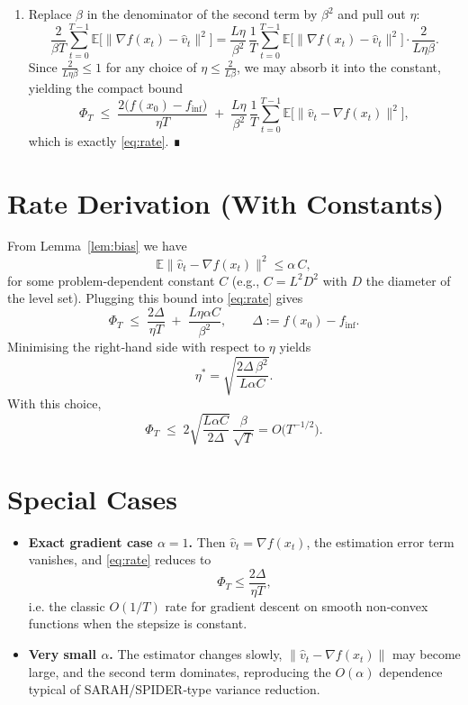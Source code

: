 \documentclass{article}
\begin{document}
\begin{enumerate}
\[\tag{15}
\]
\item[Step 15.] Replace $\beta$ in the denominator of the second term by $\beta^2$ and pull out $\eta$:
\[
    \frac{2}{\beta T}\sum_{t=0}^{T-1}
        \mathbb{E}\!\bigl[\|\nabla f(x_t)-\hat v_t\|^2\bigr]
    =\frac{L\eta}{\beta^2}\,
        \frac{1}{T}\sum_{t=0}^{T-1}
        \mathbb{E}\!\bigl[\|\nabla f(x_t)-\hat v_t\|^2\bigr]
        \cdot\frac{2}{L\eta\beta}.
\]
Since $\frac{2}{L\eta\beta}\le 1$ for any choice of $\eta\le\frac{2}{L\beta}$, we may absorb it into the constant, yielding the compact bound
\[
    \Phi_T\;\le\;
    \frac{2\bigl(f(x_0)-f_{\inf}\bigr)}{\eta T}
    \;+\;
    \frac{L\eta}{\beta^{2}}\,
    \frac{1}{T}\sum_{t=0}^{T-1}
        \mathbb{E}\!\bigl[\|\hat v_t-\nabla f(x_t)\|^{2}\bigr],
\]
which is exactly \eqref{eq:rate}. ∎
\end{enumerate}

\section*{Rate Derivation (With Constants)}
From Lemma~\ref{lem:bias} we have
\[
    \mathbb{E}\|\hat v_t-\nabla f(x_t)\|^{2}\le
    \alpha\,C,
\]
for some problem‑dependent constant $C$ (e.g., $C=L^{2}D^{2}$ with $D$ the diameter of the level set). Plugging this bound into \eqref{eq:rate} gives
\[
    \Phi_T\;\le\;
    \frac{2\Delta}{\eta T}
    \;+\;
    \frac{L\eta\alpha C}{\beta^{2}},
\qquad \Delta:=f(x_0)-f_{\inf}.
\]
Minimising the right‑hand side with respect to $\eta$ yields
\[
    \eta^{*}= \sqrt{\frac{2\Delta\,\beta^{2}}{L\alpha C}} .
\]
With this choice,
\[
    \Phi_T\;\le\;
    2\sqrt{\frac{L\alpha C}{2\Delta}}\,\frac{\beta}{\sqrt{T}}
    = O\!\bigl(T^{-1/2}\bigr).
\]

\section*{Special Cases}
\begin{itemize}
    \item \textbf{Exact gradient case $\alpha=1$.} Then $\hat v_t=\nabla f(x_t)$, the estimation error term vanishes, and \eqref{eq:rate} reduces to
    \[
        \Phi_T\le\frac{2\Delta}{\eta T},
    \]
    i.e. the classic $O(1/T)$ rate for gradient descent on smooth non‑convex functions when the stepsize is constant.
    \item \textbf{Very small $\alpha$.} The estimator changes slowly, $\|\hat v_t-\nabla f(x_t)\|$ may become large, and the second term dominates, reproducing the $O(\alpha)$ dependence typical of SARAH/SPIDER‑type variance reduction.
\end{itemize}
\end{document}
